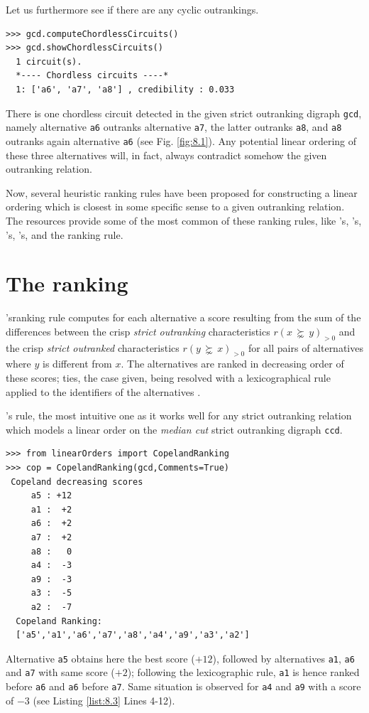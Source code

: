 Let us furthermore see if there are any cyclic outrankings.
\begin{lstlisting}
>>> gcd.computeChordlessCircuits()
>>> gcd.showChordlessCircuits()
  1 circuit(s).
  *---- Chordless circuits ----*    
  1: ['a6', 'a7', 'a8'] , credibility : 0.033
\end{lstlisting}
There is one chordless circuit detected in the given strict outranking digraph \texttt{gcd}, namely alternative \texttt{a6} outranks alternative \texttt{a7}, the latter outranks \texttt{a8}, and \texttt{a8} outranks again alternative \texttt{a6} (see Fig. \ref{fig:8.1}). Any potential linear ordering of these three alternatives will, in fact, always contradict somehow the given outranking relation.

Now, several heuristic ranking rules have been proposed for constructing a linear ordering which is closest in some specific sense to a given outranking relation. The \Digraph resources provide some of the most common of these ranking rules, like \Copeland 's, \Kemeny 's, \Slater 's, \Kohler 's, and the \RankedPairs ranking rule.

\section{The \Copeland ranking}
\label{sec:8.2}

\begin{definition}\label{def:copeland}\Copeland 'sranking rule computes for each alternative a score resulting from the sum of the differences between the crisp \emph{strict outranking} characteristics $r(x\, \succnsim \,y)_{>0}$ and the crisp \emph{strict outranked} characteristics $r(y\, \succnsim \, x)_{>0}$  for all pairs of alternatives where $y$ is different from $x$. The alternatives are ranked in decreasing order of these \Copeland scores; ties, the case given, being resolved with a lexicographical rule applied to the identifiers of the alternatives \citep{COP-1951}.
\end{definition}

\Copeland 's rule, the most intuitive one as it works well for any strict outranking relation which models a linear order on the \emph{median cut} strict outranking digraph \texttt{ccd}. 
\begin{lstlisting}[caption={Computing a \Copeland Ranking},label=list:8.3]
>>> from linearOrders import CopelandRanking
>>> cop = CopelandRanking(gcd,Comments=True)
 Copeland decreasing scores
     a5 : +12
     a1 :  +2
     a6 :  +2
     a7 :  +2
     a8 :   0
     a4 :  -3
     a9 :  -3
     a3 :  -5
     a2 :  -7
  Copeland Ranking:
  ['a5','a1','a6','a7','a8','a4','a9','a3','a2']
\end{lstlisting}
Alternative \texttt{a5} obtains here the best \Copeland score ($+12$), followed by alternatives \texttt{a1}, \texttt{a6} and \texttt{a7} with same score ($+2$); following the lexicographic rule, \texttt{a1} is hence ranked before \texttt{a6} and \texttt{a6} before \texttt{a7}. Same situation is observed for \texttt{a4} and \texttt{a9} with a score of $-3$ (see Listing \ref{list:8.3} Lines 4-12).

